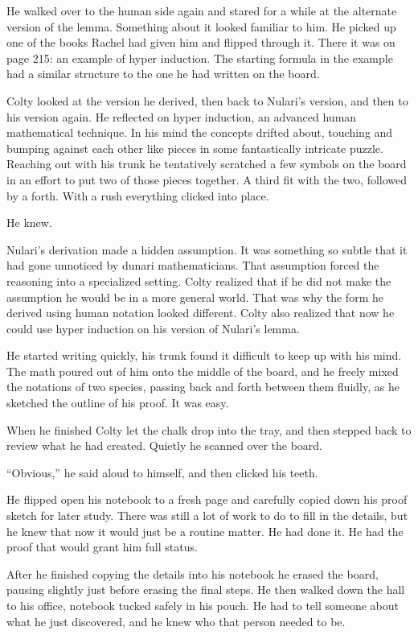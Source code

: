 He walked over to the human side again and stared for a while at the alternate version of the
lemma. Something about it looked familiar to him. He picked up one of the books Rachel had given
him and flipped through it. There it was on page 215: an example of hyper induction. The
starting formula in the example had a similar structure to the one he had written on the board.

Colty looked at the version he derived, then back to Nulari's version, and then to his version
again. He reflected on hyper induction, an advanced human mathematical technique. In his mind
the concepts drifted about, touching and bumping against each other like pieces in some
fantastically intricate puzzle. Reaching out with his trunk he tentatively scratched a few
symbols on the board in an effort to put two of those pieces together. A third fit with the two,
followed by a forth. With a rush everything clicked into place.

He knew.

Nulari's derivation made a hidden assumption. It was something so subtle that it had gone
unnoticed by dunari mathematicians. That assumption forced the reasoning into a specialized
setting. Colty realized that if he did not make the assumption he would be in a more general
world. That was why the form he derived using human notation looked different. Colty also
realized that now he could use hyper induction on his version of Nulari's lemma.

He started writing quickly, his trunk found it difficult to keep up with his mind. The math
poured out of him onto the middle of the board, and he freely mixed the notations of two
species, passing back and forth between them fluidly, as he sketched the outline of his proof.
It was easy.

When he finished Colty let the chalk drop into the tray, and then stepped back to review what he
had created. Quietly he scanned over the board.

``Obvious,'' he said aloud to himself, and then clicked his teeth.

He flipped open his notebook to a fresh page and carefully copied down his proof sketch for
later study. There was still a lot of work to do to fill in the details, but he knew that now it
would just be a routine matter. He had done it. He had the proof that would grant him full
status.

After he finished copying the details into his notebook he erased the board, pausing slightly
just before erasing the final steps. He then walked down the hall to his office, notebook tucked
safely in his pouch. He had to tell someone about what he just discovered, and he knew who that
person needed to be.

